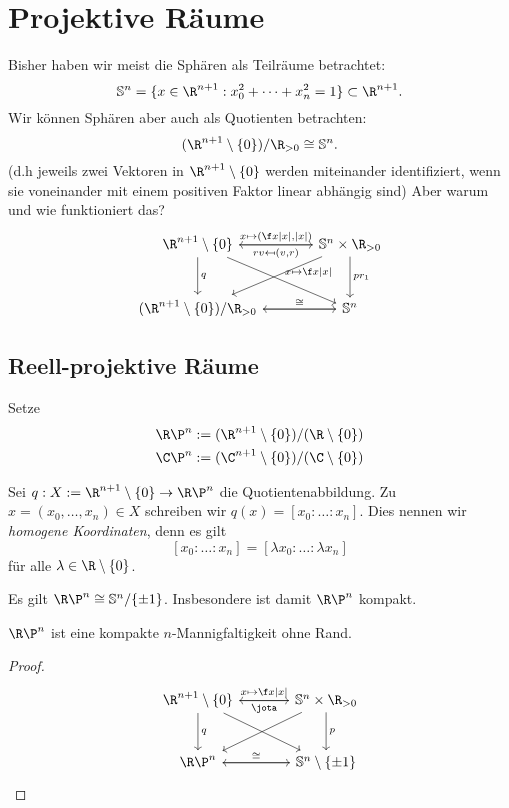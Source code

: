 \section{Projektive Räume}


Bisher haben wir meist die Sphären als Teilräume betrachtet:
\[
	\S^n = \{ x \in \R^{n+1} : x_0^2 + \dotsb + x_n^2 = 1 \} \subset \R^{n+1}.
\]
Wir können Sphären aber auch als Quotienten betrachten:
\[
	(\R^{n+1} \setminus \{0\}) / \R_{>0} \homeomorphic \S^n.
\]
(d.h jeweils zwei Vektoren in $\R^{n+1} \setminus \{0\}$ werden miteinander identifiziert, wenn sie voneinander mit einem positiven Faktor linear abhängig sind)
Aber warum und wie funktioniert das?
\[
	\begin{tikzcd}[column sep=large,row sep=large]
		\R^{n+1} \setminus \{0\} \arrow{r}{x \mapsto (\f x{|x|}, |x|)} \arrow{d}{q} \arrow{dr}{x \mapsto \f x{|x|}} &
		\S^n \times \R_{>0} \arrow{l}{rv \mapsfrom (v,r)} \arrow{dl} \arrow{d}{pr_1} \\
		(\R^{n+1} \setminus \{0\}) / \R_{>0} \arrow{r}{\homeomorphic} &
		\S^n \arrow{l}{}
	\end{tikzcd}
\]

\subsection{Reell-projektive Räume}

Setze
\begin{align*}
	\R\P^n &:= (\R^{n+1} \setminus \{0\}) / (\R \setminus \{0\}) \\
	\C\P^n &:= (\C^{n+1} \setminus \{0\}) / (\C \setminus \{0\})
\end{align*}

Sei $q: X := \R^{n+1} \setminus \{0\} \to \R\P^n$ die Quotientenabbildung.
Zu $x = (x_0, \dotsc, x_n) \in X$ schreiben wir $q(x) = [x_0 : \dotsc : x_n]$.
Dies nennen wir \emph{homogene Koordinaten}, denn es gilt
\[
	[x_0 : \dotsc : x_n ] = [\lambda x_0 : \dotsc : \lambda x_n]
\]
für alle $\lambda \in \R \setminus \{0\}$.

\begin{nt}
	Es gilt $\R\P^n \homeomorphic \S^n / \{\pm 1\}$.
	Insbesondere ist damit $\R\P^n$ kompakt.

	$\R\P^n$ ist eine kompakte $n$-Mannigfaltigkeit ohne Rand.
	\begin{proof}
		\[
			\begin{tikzcd}[column sep=large,row sep=large]
				\R^{n+1} \setminus \{0\} \arrow{r}{x\mapsto \f x{|x|}} \arrow{d}{q} \arrow{dr}{} &
				\S^n \times \R_{>0} \arrow{l}{\jota} \arrow{dl} \arrow{d}{p} \\
				\R\P^n \arrow{r}{\homeomorphic} &
				\S^n \setminus \{\pm 1\} \arrow{l}
			\end{tikzcd}
		\]
	\end{proof}
\end{nt}


